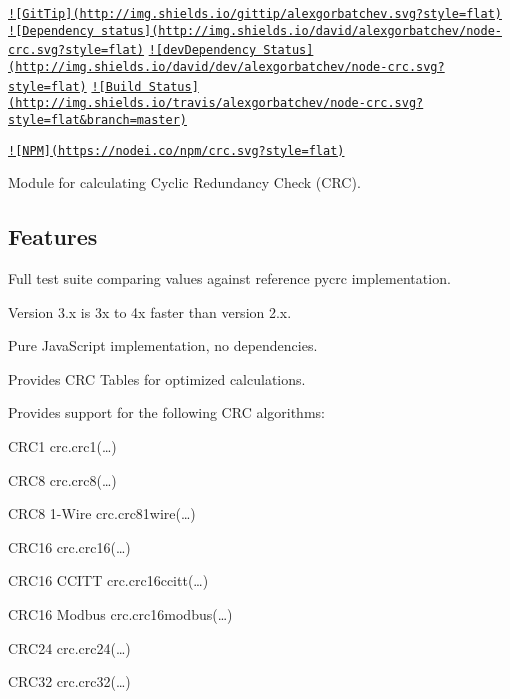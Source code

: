 \href{https://www.gittip.com/alexgorbatchev/}{\tt !\mbox{[}Git\+Tip\mbox{]}(http\+://img.\+shields.\+io/gittip/alexgorbatchev.\+svg?style=flat)} \href{https://david-dm.org/alexgorbatchev/node-crc}{\tt !\mbox{[}Dependency status\mbox{]}(http\+://img.\+shields.\+io/david/alexgorbatchev/node-\/crc.\+svg?style=flat)} \href{https://david-dm.org/alexgorbatchev/node-crc#info=devDependencies}{\tt !\mbox{[}dev\+Dependency Status\mbox{]}(http\+://img.\+shields.\+io/david/dev/alexgorbatchev/node-\/crc.\+svg?style=flat)} \href{https://travis-ci.org/alexgorbatchev/node-crc}{\tt !\mbox{[}Build Status\mbox{]}(http\+://img.\+shields.\+io/travis/alexgorbatchev/node-\/crc.\+svg?style=flat\&branch=master)}

\href{https://npmjs.org/package/node-crc}{\tt !\mbox{[}N\+P\+M\mbox{]}(https\+://nodei.\+co/npm/crc.\+svg?style=flat)}

Module for calculating Cyclic Redundancy Check (C\+R\+C).

\subsection*{Features}


\begin{DoxyItemize}
\item Full test suite comparing values against reference {\ttfamily pycrc} implementation.
\item Version 3.\+x is 3x to 4x faster than version 2.\+x.
\item Pure Java\+Script implementation, no dependencies.
\item Provides C\+R\+C Tables for optimized calculations.
\item Provides support for the following C\+R\+C algorithms\+:
\begin{DoxyItemize}
\item C\+R\+C1 {\ttfamily crc.\+crc1(…)}
\item C\+R\+C8 {\ttfamily crc.\+crc8(…)}
\item C\+R\+C8 1-\/\+Wire {\ttfamily crc.\+crc81wire(…)}
\item C\+R\+C16 {\ttfamily crc.\+crc16(…)}
\item C\+R\+C16 C\+C\+I\+T\+T {\ttfamily crc.\+crc16ccitt(…)}
\item C\+R\+C16 Modbus {\ttfamily crc.\+crc16modbus(…)}
\item C\+R\+C24 {\ttfamily crc.\+crc24(…)}
\item C\+R\+C32 {\ttfamily crc.\+crc32(…)}
\end{DoxyItemize}
\end{DoxyItemize}

